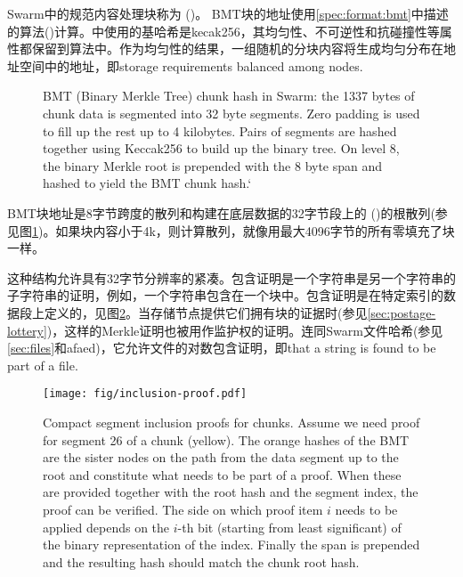 Swarm中的规范内容处理块称为 ()。
BMT块的地址使用\ref{spec:format:bmt}中描述的算法()计算。中使用的基哈希是kecak256，其均匀性、不可逆性和抗碰撞性等属性都保留到算法中。作为均匀性的结果，一组随机的分块内容将生成均匀分布在地址空间中的地址，即\imposing storage requirements balanced among nodes.\begin{figure}[htbp]
   \centering
   \resizebox{1\textwidth}{!}{
   }
   \caption[BMT: Binary Merkle Tree hash used as chunk hash in Swarm \statusgreen]{BMT (Binary Merkle Tree) chunk hash in Swarm: the 1337 bytes of chunk data is segmented into 32 byte segments. Zero padding is used to fill up the rest up to 4 kilobytes. Pairs of segments are hashed together using Keccak256 to build up the binary tree. On level 8, the binary Merkle root is prepended with the 8 byte span and hashed to yield the BMT chunk hash.`}
   \label{fig:BMT}
\end{figure}

BMT块地址是8字节跨度的散列和构建在底层数据的32字节段上的 ()的根散列(参见图\ref{fig:BMT})。如果块内容小于4k，则计算散列，就像用最大4096字节的所有零填充了块一样。

这种结构允许具有32字节分辨率的紧凑。包含证明是一个字符串是另一个字符串的子字符串的证明，例如，一个字符串包含在一个块中。包含证明是在特定索引的数据段上定义的，见图\ref{fig:chunk-inclusion}。当存储节点提供它们拥有块的证据时(参见\ref{sec:postage-lottery})，这样的Merkle证明也被用作监护权的证明。连同Swarm文件哈希(参见\ref{sec:files}和afaed)，它允许文件的对数包含证明，即\proof that a string is found to be part of a file.\begin{figure}[htbp]
\centering
\texttt{[image: fig/inclusion-proof.pdf]}
\caption[Compact segment inclusion proofs for chunks \statusgreen]{Compact segment inclusion proofs for chunks. Assume we need proof for segment 26 of a chunk (yellow). The orange hashes of the BMT are the sister nodes on the path from the data segment up to the root and constitute what needs to be part of a proof. When these are provided together with the root hash and the segment index, the proof can be verified. The side on which proof item $i$ needs to be applied depends on the $i$-th bit (starting from least significant) of the binary representation of the index. Finally the span is prepended and the resulting hash should match the chunk root hash.}
\label{fig:chunk-inclusion}
\end{figure}


